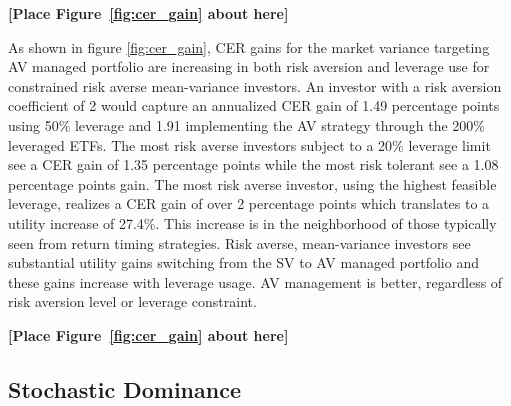\bigskip
\centerline{\bf [Place Figure~\ref{fig:cer_gain} about here]}
\bigskip

As shown in figure \ref{fig:cer_gain}, CER gains for the market variance targeting AV managed portfolio are increasing in both risk aversion and leverage use for constrained risk averse mean-variance investors. An investor with a risk aversion coefficient of 2 would capture an annualized CER gain of 1.49 percentage points using 50\% leverage and 1.91 implementing the AV strategy through the 200\% leveraged ETFs. The most risk averse investors subject to a 20\% leverage limit see a CER gain of 1.35 percentage points while the most risk tolerant see a 1.08 percentage points gain. The most risk averse investor, using the highest feasible leverage, realizes a CER gain of over 2 percentage points which translates to a utility increase of 27.4\%. This increase is in the neighborhood of those typically seen from return timing strategies. \citep{campbell1997econometrics,moreira_volatility-managed_2017} Risk averse, mean-variance investors see substantial utility gains switching from the SV to AV managed portfolio and these gains increase with leverage usage. AV management is better, regardless of risk aversion level or leverage constraint.

\bigskip
\centerline{\bf [Place Figure~\ref{fig:cer_gain} about here]}
\bigskip

\subsection{Stochastic Dominance} \label{sec:stoc_dom}

